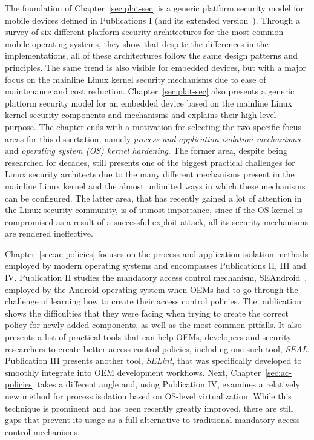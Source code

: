 The foundation of Chapter~\ref{sec:plat-sec} is a generic platform security model for mobile devices defined in Publications I (and its extended version~\cite{2013Asokan}). Through a survey of six different platform security architectures for the most common mobile operating systems, they show that despite the differences in the implementations, all of these architectures follow the same design patterns and principles. The same trend is also visible for embedded devices, but with a major focus on the mainline Linux kernel security mechanisms due to ease of maintenance and cost reduction. Chapter~\ref{sec:plat-sec} also presents a generic platform security model for an embedded device based on the mainline Linux kernel security components and mechanisms and explains their high-level purpose. The chapter ends with a motivation for selecting the two specific focus areas for this dissertation, namely \textit{process and application isolation mechanisms} and \textit{operating system (OS) kernel hardening}. The former area, despite being researched for decades, still presents one of the biggest practical challenges for Linux security architects due to the many different mechanisms present in the mainline Linux kernel and the almost unlimited ways in which these mechanisms can be configured. The latter area, that has recently gained a lot of attention in the Linux security community, is of utmost importance, since if the OS kernel is compromised as a result of a successful exploit attack, all its security mechanisms are rendered ineffective.

Chapter~\ref{sec:ac-policies} focuses on the process and application isolation methods employed by modern operating systems and encompasses Publications II, III and IV. Publication II studies the mandatory access control mechanism, SEAndroid~\cite{smalley12}, employed by the Android operating system when OEMs had to go through the challenge of learning how to create their access control policies. The publication shows the difficulties that they were facing when trying to create the correct policy for newly added components, as well as the most common pitfalls. It also presents a list of practical tools that can help OEMs, developers and security researchers to create better access control policies, including one such tool, \textit{SEAL}. Publication III presents another tool, \textit{SELint}, that was specifically developed to smoothly integrate into OEM development workflows. Next, Chapter~\ref{sec:ac-policies} takes a different angle and, using Publication IV, examines a relatively new method for process isolation based on OS-level virtualization. While this technique is prominent and has been recently greatly improved, there are still gaps that prevent its usage as a full alternative to traditional mandatory access control mechanisms.

